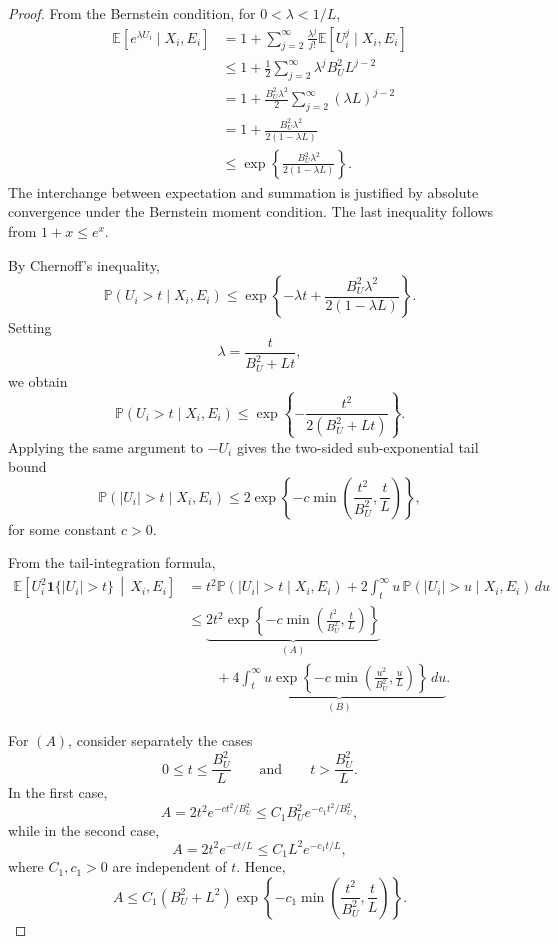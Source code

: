 \documentclass[11pt]{article}
\newcommand{\E}{\mathbb{E}}
\newcommand{\Pp}{\mathbb{P}}
\begin{document}
\begin{proof}
From the Bernstein condition, for $0<\lambda<1/L$,
\begin{align*}
\E[e^{\lambda U_i}\mid X_i,E_i]
&=
1+\sum_{j=2}^\infty
\frac{\lambda^j}{j!}\E[U_i^j\mid X_i,E_i]
\\
&\leq
1+\frac{1}{2}
\sum_{j=2}^\infty
\lambda^jB_U^2L^{j-2}
\\
&=
1+\frac{B_U^2\lambda^2}{2}
\sum_{j=2}^\infty(\lambda L)^{j-2}
\\
&=
1+
\frac{B_U^2\lambda^2}
     {2(1-\lambda L)}
\\
&\leq
\exp\!\left\{
    \frac{B_U^2\lambda^2}
         {2(1-\lambda L)}
\right\}.
\end{align*}
The interchange between expectation and summation is justified by
absolute convergence under the Bernstein moment condition. The last
inequality follows from $1+x\leq e^x$.

By Chernoff's inequality,
\[
\Pp(U_i>t\mid X_i,E_i)
\leq
\exp\!\left\{
    -\lambda t+
    \frac{B_U^2\lambda^2}
         {2(1-\lambda L)}
\right\}.
\]
Setting
\[
\lambda
=
\frac{t}{B_U^2+Lt},
\]
we obtain
\[
\Pp(U_i>t\mid X_i,E_i)
\leq
\exp\!\left\{
    -\frac{t^2}
           {2(B_U^2+Lt)}
\right\}.
\]
Applying the same argument to $-U_i$ gives the two-sided
sub-exponential tail bound
\begin{equation}
\label{eq:bernstein_error_tail}
\Pp(|U_i|>t\mid X_i,E_i)
\leq
2\exp\!\left\{
    -c\min\left(
        \frac{t^2}{B_U^2},
        \frac{t}{L}
    \right)
\right\},
\end{equation}
for some constant $c>0$.

From the tail-integration formula,
\begin{align*}
\E\!\left[
    U_i^2\bm{1}\{|U_i|>t\}
    \,\middle|\,X_i,E_i
\right]
&=
t^2\Pp(|U_i|>t\mid X_i,E_i)
+
2\int_t^\infty
u\,\Pp(|U_i|>u\mid X_i,E_i)\,du
\\
&\leq
\underbrace{
2t^2
\exp\!\left\{
    -c\min\left(
        \frac{t^2}{B_U^2},
        \frac{t}{L}
    \right)
\right\}
}_{(A)}
\\
&\qquad
+
\underbrace{
4\int_t^\infty
u
\exp\!\left\{
    -c\min\left(
        \frac{u^2}{B_U^2},
        \frac{u}{L}
    \right)
\right\}
\,du
}_{(B)}.
\end{align*}

For $(A)$, consider separately the cases
\[
0\leq t\leq \frac{B_U^2}{L}
\qquad\text{and}\qquad
t>\frac{B_U^2}{L}.
\]
In the first case,
\[
A
=
2t^2e^{-ct^2/B_U^2}
\leq
C_1B_U^2
e^{-c_1t^2/B_U^2},
\]
while in the second case,
\[
A
=
2t^2e^{-ct/L}
\leq
C_1L^2e^{-c_1t/L},
\]
where $C_1,c_1>0$ are independent of $t$. Hence,
\[
A
\leq
C_1(B_U^2+L^2)
\exp\!\left\{
    -c_1\min\left(
        \frac{t^2}{B_U^2},
        \frac{t}{L}
    \right)
\right\}.
\]


\end{proof}
\end{document}
